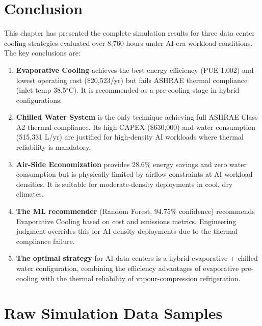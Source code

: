 \documentclass[12pt,a4paper]{report}
\newcommand{\degC}{$^{\circ}$C}
\begin{document}
\newpage

\chapter{Conclusion}
\label{ch:conclusion}

This chapter has presented the complete simulation results for three data center cooling
strategies evaluated over 8{,}760 hours under AI-era workload conditions. The key conclusions are:

\begin{enumerate}
  \item \textbf{Evaporative Cooling} achieves the best energy efficiency (PUE 1.002) and lowest
  operating cost (\$20{,}523/yr) but fails ASHRAE thermal compliance (inlet temp 38.5\degC).
  It is recommended as a pre-cooling stage in hybrid configurations.
  
  \item \textbf{Chilled Water System} is the only technique achieving full ASHRAE Class A2
  thermal compliance. Its high CAPEX (\$630{,}000) and water consumption (515{,}331 L/yr)
  are justified for high-density AI workloads where thermal reliability is mandatory.
  
  \item \textbf{Air-Side Economization} provides 28.6\% energy savings and zero water consumption
  but is physically limited by airflow constraints at AI workload densities. It is suitable
  for moderate-density deployments in cool, dry climates.
  
  \item \textbf{The ML recommender} (Random Forest, 94.75\% confidence) recommends Evaporative
  Cooling based on cost and emissions metrics. Engineering judgment overrides this for AI-density
  deployments due to the thermal compliance failure.
  
  \item \textbf{The optimal strategy} for AI data centers is a hybrid evaporative + chilled water
  configuration, combining the efficiency advantages of evaporative pre-cooling with the thermal
  reliability of vapour-compression refrigeration.
\end{enumerate}

\newpage

\appendix
\chapter{Raw Simulation Data Samples}
\label{app:raw}
\end{document}

